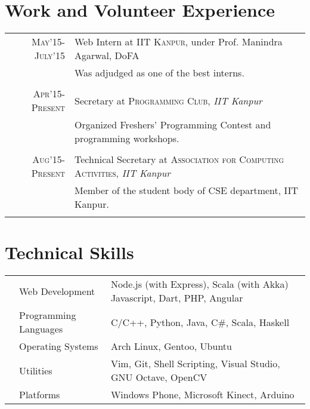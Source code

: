 \documentclass[11pt,a4paper]{article}
\begin{document}
\vspace{-0.4cm}
\section*{Work and Volunteer Experience}
\vspace{-0.2cm}
\bgroup
\def\arraystretch{0.6}
\begin{tabular}{r|p{20cm}}
\textsc{May'15-July'15} & Web Intern at \textsc{IIT Kanpur}, under Prof. Manindra Agarwal, DoFA\\
                        &\footnotesize{Was adjudged as one of the best interns.}\\\multicolumn{2}{c}{} \\
\textsc{Apr'15-Present} & Secretary at \textsc{Programming Club}, \emph{IIT Kanpur}\\
&\footnotesize{Organized Freshers' Programming Contest and programming workshops.}\\\multicolumn{2}{c}{} \\

\textsc{Aug'15-Present} & Technical Secretary at \textsc{Association for Computing Activities}, \emph{IIT Kanpur}\\
&\footnotesize{Member of the student body of CSE department, IIT Kanpur.}\\\multicolumn{2}{c}{} \\

\end{tabular}
\egroup

\vspace{-0.4cm}
\section*{Technical Skills}
\vspace{-0.2cm}
\begin{tabular}{L{0.05cm} L{5cm} l}
  &Web Development 	        &Node.js (with Express), Scala (with Akka) Javascript, Dart, PHP, Angular\\
&Programming Languages      &C/C++, Python, Java, C\#, Scala, Haskell\\
&Operating Systems	        &Arch Linux, Gentoo, Ubuntu\\
&Utilities                  &Vim, Git, Shell Scripting, Visual Studio, GNU Octave, OpenCV\\
&Platforms                  &Windows Phone, Microsoft Kinect, Arduino\\

\end{tabular}
\end{document}
